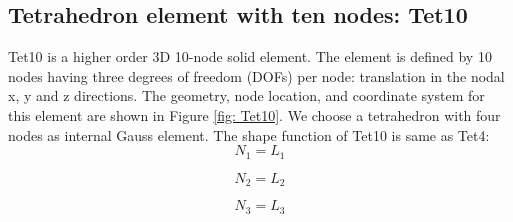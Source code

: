 \subsection{Tetrahedron element with ten nodes: Tet10}
Tet10 is a higher order 3D 10-node solid element. The element is defined by 10 nodes having three degrees of freedom (DOFs) per node: translation in the nodal x, y and z directions. The geometry, node location, and coordinate system for this element are shown in Figure \ref{fig: Tet10}. We choose a tetrahedron with four nodes as internal Gauss element. The shape function of Tet10 is same as Tet4:
\begin{equation}
N_1 = L_1
\end{equation}

\begin{equation}
N_2 = L_2
\end{equation}

\begin{equation}
N_3 = L_3
\end{equation}

